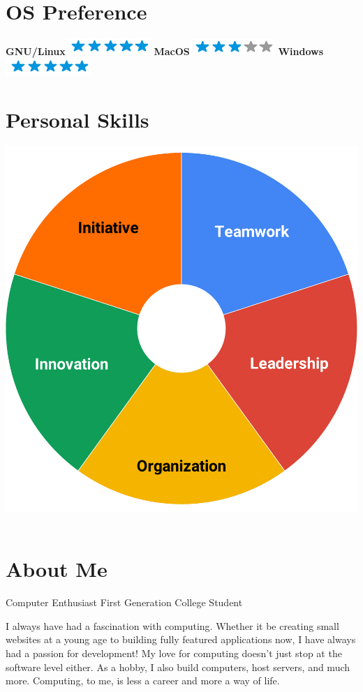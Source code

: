 \documentclass[]{friggeri-cv}
\begin{document}
\begin{aside}
  \section{OS Preference}
    \textbf{GNU/Linux}\includegraphics[scale=0.40]{img/5stars.png}
    \textbf{MacOS}\includegraphics[scale=0.40]{img/3stars.png}
    \textbf{Windows}\includegraphics[scale=0.40]{img/5stars.png}
    ~
  \section{Personal Skills}
    \includegraphics[scale=0.18]{img/skills.pdf}
    ~
\end{aside}

\section{About Me}
\begin{entrylist}
	\entry
	{}
	{Computer Enthusiast}
	{First Generation College Student}
	{
		I always have had a fascination with computing. Whether it be creating small websites at a young age to building fully featured applications now, I have always had a passion for development!  My love for computing doesn't just stop at the software level either.  As a hobby, I also build computers, host servers, and much more.  Computing, to me, is less a career and more a way of life.

	}
\end{entrylist}
\end{document}
